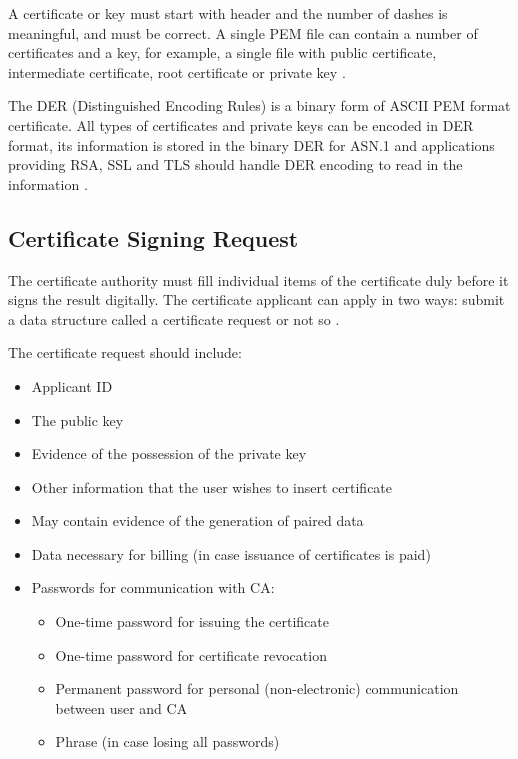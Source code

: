 \documentclass[
  digital, %
  notable,   %
  lof,     %
  lot,     %
]{fithesis3}
\begin{document}
A certificate or key must start with header and the number of dashes is meaningful, and must 
be correct. A single PEM file can contain a number of certificates and a key, for example, a 
single file with public certificate, intermediate certificate, root certificate or private key 
\cite{howToSsl}.

The DER (Distinguished Encoding Rules) is a binary form of ASCII PEM format 
certificate. All types of certificates and private keys can be encoded in DER format, its 
information is stored in the binary DER for ASN.1 and applications providing RSA, SSL and TLS 
should handle DER encoding to read in the information \cite{bakker_2014}.

\subsection{Certificate Signing Request}
The certificate authority must fill individual items of the certificate duly before it signs 
the result digitally. The certificate applicant can apply in two ways: submit a data 
structure called a certificate request or not so \cite{dostalek2016velky}.

The certificate request should include:
\begin{itemize}[leftmargin=2em,rightmargin=1em,itemsep=0.75\parskip,parsep=0em,topsep=0em,partopsep=0em]
\item Applicant ID
\item The public key
\item Evidence of the possession of the private key
\item Other information that the user wishes to insert certificate
\item May contain evidence of the generation of paired data
\item Data necessary for billing (in case issuance of certificates is paid)
\item Passwords for communication with CA:
  \begin{itemize}[leftmargin=2em,rightmargin=1em,itemsep=0.75\parskip,parsep=0em,topsep=0em,partopsep=0em]
  \item One-time password for issuing the certificate
  \item One-time password for certificate revocation
  \item Permanent password for personal (non-electronic) communication between user and CA
  \item Phrase (in case losing all passwords) 
  \end{itemize}
\end{itemize} 
\end{document}
